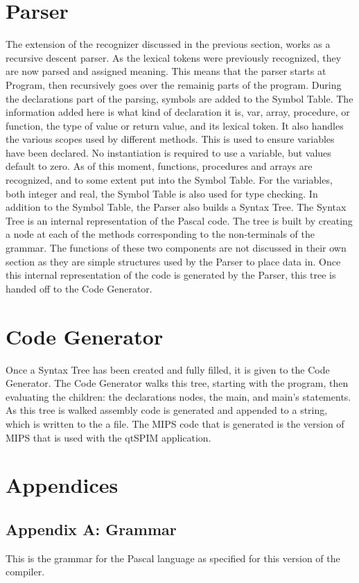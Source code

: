 \documentclass[12pt]{scrreprt}
\begin{document}
\chapter{Parser}
The extension of the recognizer discussed in the previous section, works as a recursive
descent parser. As the lexical tokens were previously recognized, they are now parsed and
assigned meaning. This means that the parser starts at Program, then recursively goes
over the remainig parts of the program. During the declarations part of the parsing, symbols
are added to the Symbol Table. The information added here is what kind of declaration it is,
var, array, procedure, or function, the type of value or return value, and its lexical
token. It also handles the various scopes used by different methods. This is used to ensure
variables have been declared. No instantiation is required to use a variable, but values
default to zero. As of this moment, functions, procedures and arrays are recognized, and to
some extent put into the Symbol Table. For the variables, both integer and real, the Symbol
Table is also used for type checking. In addition to the Symbol Table, the Parser also
builds a Syntax Tree. The Syntax Tree is an internal representation of the Pascal code. The
tree is built by creating a node at each of the methods corresponding to the non-terminals of
the grammar. The functions of these two components are not discussed in their own section as 
they are simple structures used by the Parser to place data in. Once this internal 
representation of the code is generated by the Parser, this tree is handed off to the 
Code Generator.

\chapter{Code Generator}
Once a Syntax Tree has been created and fully filled, it is given to the Code Generator.
The Code Generator walks this tree, starting with the program, then evaluating the
children: the declarations nodes, the main, and main's statements. As this tree is walked
assembly code is generated and appended to a string, which is written to the a file. The
MIPS code that is generated is the version of MIPS that is used with the qtSPIM application.



\chapter{Appendices}
\section{Appendix A: Grammar}
This is the grammar for the Pascal language as specified for this version of the compiler.


\end{document}
